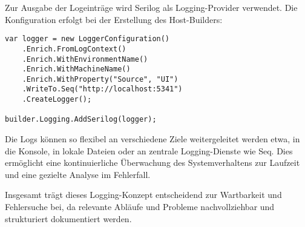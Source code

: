 Zur Ausgabe der Logeinträge wird Serilog als Logging-Provider verwendet.
Die Konfiguration erfolgt bei der Erstellung des Host-Builders:

\begin{lstlisting}
var logger = new LoggerConfiguration()
    .Enrich.FromLogContext()
    .Enrich.WithEnvironmentName()
    .Enrich.WithMachineName()
    .Enrich.WithProperty("Source", "UI")
    .WriteTo.Seq("http://localhost:5341")
    .CreateLogger();

builder.Logging.AddSerilog(logger);
\end{lstlisting}

Die Logs können so flexibel an verschiedene Ziele weitergeleitet werden etwa,
in die Konsole, in lokale Dateien oder an zentrale Logging-Dienste wie Seq.
Dies ermöglicht eine kontinuierliche Überwachung des Systemverhaltens zur
Laufzeit und eine gezielte Analyse im Fehlerfall.

Insgesamt trägt dieses Logging-Konzept entscheidend zur Wartbarkeit und Fehlersuche bei,
da relevante Abläufe und Probleme nachvollziehbar und strukturiert dokumentiert werden.
